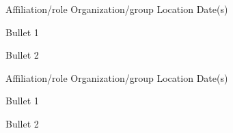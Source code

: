 

\begin{cventries}

  \cventry
    {Affiliation/role} %
    {Organization/group} %
    {Location} %
    {Date(s)} %
    {} %
    {
      \begin{cvitems} %
        \item {Bullet 1}
        \item {Bullet 2}
      \end{cvitems}
    }

  \cventry
    {Affiliation/role} %
    {Organization/group} %
    {Location} %
    {Date(s)} %
    {} %
    {
    \begin{cvitems} %
        \item {Bullet 1}
        \item {Bullet 2}
    \end{cvitems}
    }

\end{cventries}
